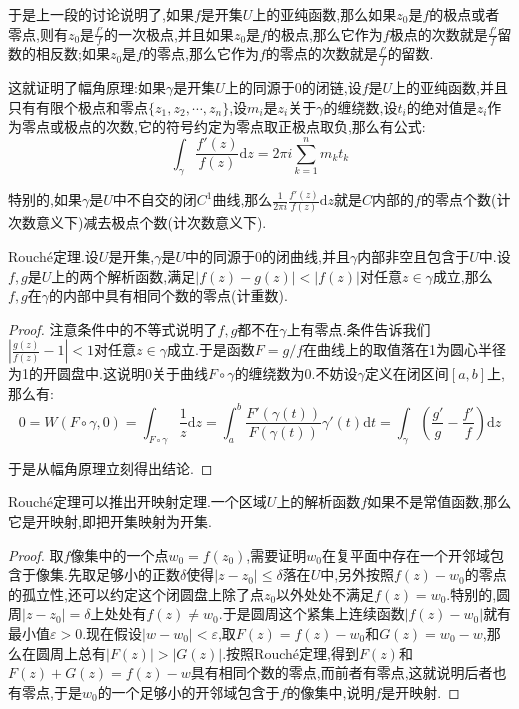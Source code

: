 于是上一段的讨论说明了,如果$f$是开集$U$上的亚纯函数,那么如果$z_0$是$f$的极点或者零点,则有$z_0$是$\frac{f'}{f}$的一次极点,并且如果$z_0$是$f$的极点,那么它作为$f$极点的次数就是$\frac{f'}{f}$留数的相反数;如果$z_0$是$f$的零点,那么它作为$f$的零点的次数就是$\frac{f'}{f}$的留数.

这就证明了幅角原理:如果$\gamma$是开集$U$上的同源于0的闭链,设$f$是$U$上的亚纯函数,并且只有有限个极点和零点$\{z_1,z_2,\cdots,z_n\}$,设$m_i$是$z_i$关于$\gamma$的缠绕数,设$t_i$的绝对值是$z_i$作为零点或极点的次数,它的符号约定为零点取正极点取负,那么有公式:
$$\int_{\gamma}\frac{f'(z)}{f(z)}\mathrm{d}z=2\pi i\sum_{k=1}^nm_kt_k$$

特别的,如果$\gamma$是$U$中不自交的闭$C^1$曲线,那么$\frac{1}{2\pi i}\frac{f'(z)}{f(z)}\mathrm{d}z$就是$C$内部的$f$的零点个数(计次数意义下)减去极点个数(计次数意义下).

Rouch\'e定理.设$U$是开集,$\gamma$是$U$中的同源于0的闭曲线,并且$\gamma$内部非空且包含于$U$中.设$f,g$是$U$上的两个解析函数,满足$|f(z)-g(z)|<|f(z)|$对任意$z\in\gamma$成立,那么$f,g$在$\gamma$的内部中具有相同个数的零点(计重数).
\begin{proof}
	
	注意条件中的不等式说明了$f,g$都不在$\gamma$上有零点.条件告诉我们$\left|\frac{g(z)}{f(z)}-1\right|<1$对任意$z\in\gamma$成立.于是函数$F=g/f$在曲线上的取值落在1为圆心半径为1的开圆盘中.这说明$0$关于曲线$F\circ\gamma$的缠绕数为0.不妨设$\gamma$定义在闭区间$[a,b]$上,那么有:
	$$0=W(F\circ\gamma,0)=\int_{F\circ\gamma}\frac{1}{z}\mathrm{d}z=\int_a^b\frac{F'(\gamma(t))}{F(\gamma(t))}\gamma'(t)\mathrm{d}t=\int_{\gamma}\left(\frac{g'}{g}-\frac{f'}{f}\right)\mathrm{d}z$$
	
	于是从幅角原理立刻得出结论.
\end{proof}

Rouch\'e定理可以推出开映射定理.一个区域$U$上的解析函数$f$如果不是常值函数,那么它是开映射,即把开集映射为开集.
\begin{proof}
	
	取$f$像集中的一个点$w_0=f(z_0)$,需要证明$w_0$在复平面中存在一个开邻域包含于像集.先取足够小的正数$\delta$使得$|z-z_0|\le\delta$落在$U$中,另外按照$f(z)-w_0$的零点的孤立性,还可以约定这个闭圆盘上除了点$z_0$以外处处不满足$f(z)=w_0$.特别的,圆周$|z-z_0|=\delta$上处处有$f(z)\not=w_0$.于是圆周这个紧集上连续函数$|f(z)-w_0|$就有最小值$\varepsilon>0$.现在假设$|w-w_0|<\varepsilon$,取$F(z)=f(z)-w_0$和$G(z)=w_0-w$,那么在圆周上总有$|F(z)|>|G(z)|$.按照Rouch\'e定理,得到$F(z)$和$F(z)+G(z)=f(z)-w$具有相同个数的零点,而前者有零点,这就说明后者也有零点,于是$w_0$的一个足够小的开邻域包含于$f$的像集中,说明$f$是开映射.
\end{proof}


